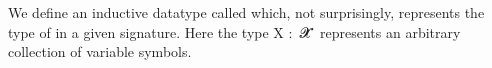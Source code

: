\documentclass[a4paper,UKenglish,cleveref,autoref,thm-restate]{lipics-v2021}
\begin{document}
We define an inductive datatype called  which, not surprisingly, represents the type of  in a given signature. Here the type \ab X \as :~\ab 𝓧 \af ̇ represents an arbitrary collection of variable symbols.
\ccpad
\begin{code}%
\>[0]\AgdaSpace{}%
\AgdaSpace{}%
\AgdaSymbol{\{}\AgdaSpace{}%
\AgdaSymbol{:}\AgdaSpace{}%
\AgdaSymbol{\}\{}\AgdaSpace{}%
\AgdaSymbol{:}\AgdaSpace{}%
\AgdaSpace{}%
\AgdaSymbol{\}}\AgdaSpace{}%
\AgdaSymbol{:}\AgdaSpace{}%
\AgdaSpace{}%
\AgdaSpace{}%
\AgdaSpace{}%
\AgdaSpace{}%
\AgdaSpace{}%
\AgdaSpace{}%
%
\>[51]\<%
\\
\>[0][@{}l@{\AgdaIndent{0}}]%
\>[2]\AgdaSpace{}%
\AgdaSymbol{:}\AgdaSpace{}%
\AgdaSpace{}%
\AgdaSpace{}%
\AgdaSymbol{\{}\AgdaSymbol{\}\{}\AgdaSymbol{\}}\<%
\\
%
\>[2]\AgdaSpace{}%
\AgdaSymbol{:}\AgdaSpace{}%
\AgdaSymbol{(}\AgdaSpace{}%
\AgdaSymbol{:}\AgdaSpace{}%
\AgdaSpace{}%
\AgdaSpace{}%
\AgdaSymbol{)(}\AgdaSpace{}%
\AgdaSymbol{:}\AgdaSpace{}%
\AgdaSpace{}%
\AgdaSpace{}%
\AgdaSpace{}%
\AgdaSpace{}%
\AgdaSpace{}%
\AgdaSymbol{\{}\AgdaSymbol{\}\{}\AgdaSymbol{\})}\AgdaSpace{}%
\AgdaSpace{}%
\<%
\end{code}
\end{document}
